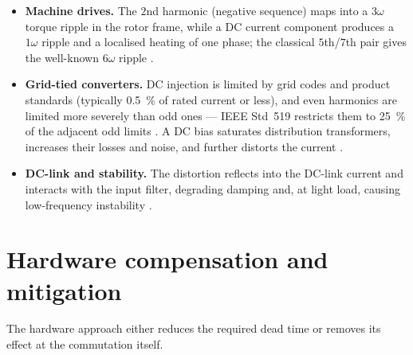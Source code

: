 \documentclass[11pt,a4paper]{article}
\begin{document}
\begin{itemize}
\item \textbf{Machine drives.} The $2$nd harmonic (negative sequence) maps into a
$3\omega$ torque ripple in the rotor frame, while a DC current component produces a
$1\omega$ ripple and a localised heating of one phase; the classical $5$th/$7$th pair
gives the well-known $6\omega$ ripple \cite{sukegawa1991,kim2003,kim2010}.
\item \textbf{Grid-tied converters.} DC injection is limited by grid codes and product
standards (typically \SI{0.5}{\percent} of rated current or less), and even harmonics are
limited more severely than odd ones --- IEEE Std~519 restricts them to \SI{25}{\percent}
of the adjacent odd limits \cite{ieee519,iec61000_3_2,iec61727,ieee1547}. A DC bias
saturates distribution transformers, increases their losses and noise, and further
distorts the current \cite{buticchi2013}.
\item \textbf{DC-link and stability.} The distortion reflects into the DC-link current and
interacts with the input filter, degrading damping and, at light load, causing
low-frequency instability \cite{guha2018}.
\end{itemize}

\section{Hardware compensation and mitigation}

The hardware approach either reduces the required dead time or removes its effect at the
commutation itself.
\end{document}
